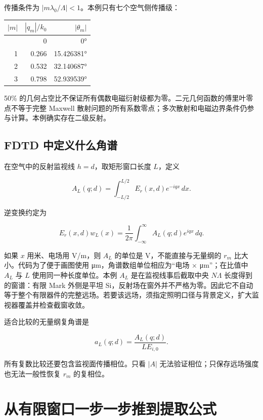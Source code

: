 \documentclass[
  chinese,
  UTF8,
  a4paper,
  11pt]{ctexart}
\newcounter{none} %
\begin{document}
传播条件为 \(|m\lambda_0/\Lambda|<1\)。本例只有七个空气侧传播级：

{\def\LTcaptype{none} %
\begin{longtable}[]{@{}rrr@{}}
\toprule\noalign{}
\(|m|\) & \(|q_m|/k_0\) & \(|\theta_m|\) \\
\midrule\noalign{}
\endhead
\bottomrule\noalign{}
\endlastfoot
0 & 0 & 0° \\
1 & 0.266 & 15.426381° \\
2 & 0.532 & 32.140687° \\
3 & 0.798 & 52.939539° \\
\end{longtable}
}

50\%
的几何占空比不保证所有偶数电磁衍射级都为零。二元几何函数的傅里叶零点不等于完整
Maxwell
散射问题的所有系数零点；多次散射和电磁边界条件仍参与计算。本例确实存在二级反射。

\subsection{FDTD
中定义什么角谱}\label{fdtd-ux4e2dux5b9aux4e49ux4ec0ux4e48ux89d2ux8c31}

在空气中的反射监视线 \(h=d\)，取矩形窗口长度 \(L\)，定义

\[A_L(q;d)=\int_{-L/2}^{L/2} E_r(x,d)e^{-iqx}\,dx.\]

逆变换约定为

\[E_r(x,d)w_L(x)=\frac{1}{2\pi}\int_{-\infty}^{\infty}A_L(q;d)e^{iqx}\,dq.\]

如果 \(x\) 用米、电场用 V/m，则 \(A_L\) 的单位是 V，不能直接与无量纲的
\(r_m\) 比大小。代码为了便于画图使用 μm，角谱数组单位相应为``电场 ×
μm''；在比值中 \(A_L\) 与 \(L\) 使用同一种长度单位。本例 \(A_L\)
是在监视线事后截取中央 \(N\Lambda\) 长度得到的窗谱：有限 Mark 外侧是平坦
Si，反射场在窗外并不严格为零。因此它不自动等于整个有限器件的完整远场。若要该远场，须指定照明口径与背景定义，扩大监视器覆盖并检查截窗收敛。

适合比较的无量纲复角谱是

\[a_L(q;d)=\frac{A_L(q;d)}{L E_{i,0}}.\]

所有复数比较还要包含监视面传播相位。只看 \(|A|\)
无法验证相位；只保存远场强度也无法一般性恢复 \(r_m\) 的复相位。

\section{从有限窗口一步一步推到提取公式}\label{ux4eceux6709ux9650ux7a97ux53e3ux4e00ux6b65ux4e00ux6b65ux63a8ux5230ux63d0ux53d6ux516cux5f0f}
\end{document}
